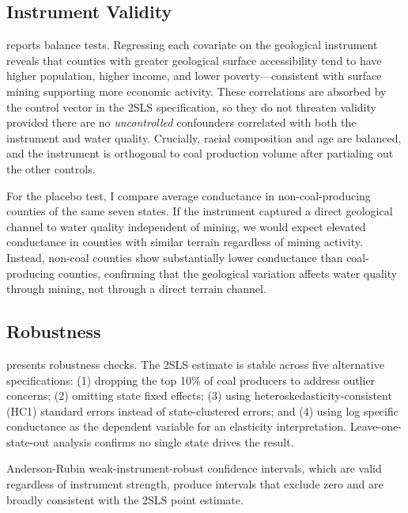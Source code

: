\documentclass[12pt]{article}
\begin{document}
\subsection{Instrument Validity}



 reports balance tests. Regressing each covariate on the geological instrument reveals that counties with greater geological surface accessibility tend to have higher population, higher income, and lower poverty---consistent with surface mining supporting more economic activity. These correlations are absorbed by the control vector in the 2SLS specification, so they do not threaten validity provided there are no \textit{uncontrolled} confounders correlated with both the instrument and water quality. Crucially, racial composition and age are balanced, and the instrument is orthogonal to coal production volume after partialing out the other controls.

For the placebo test, I compare average conductance in non-coal-producing counties of the same seven states. If the instrument captured a direct geological channel to water quality independent of mining, we would expect elevated conductance in counties with similar terrain regardless of mining activity. Instead, non-coal counties show substantially lower conductance than coal-producing counties, confirming that the geological variation affects water quality through mining, not through a direct terrain channel.

\subsection{Robustness}



 presents robustness checks. The 2SLS estimate is stable across five alternative specifications: (1) dropping the top 10\% of coal producers to address outlier concerns; (2) omitting state fixed effects; (3) using heteroskedasticity-consistent (HC1) standard errors instead of state-clustered errors; and (4) using log specific conductance as the dependent variable for an elasticity interpretation. Leave-one-state-out analysis confirms no single state drives the result.

Anderson-Rubin weak-instrument-robust confidence intervals, which are valid regardless of instrument strength, produce intervals that exclude zero and are broadly consistent with the 2SLS point estimate.
\end{document}
